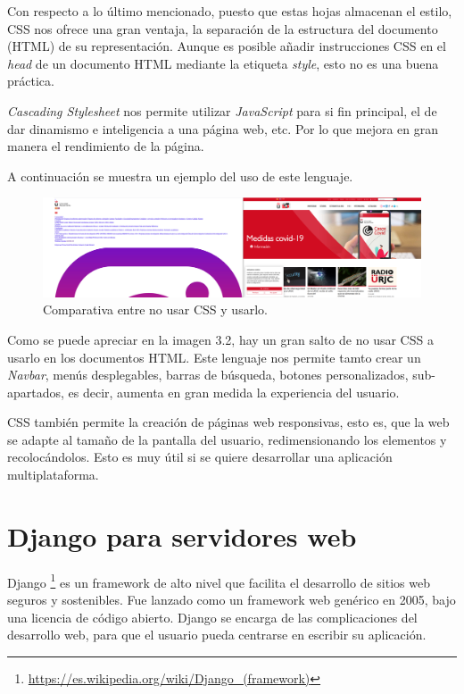 \documentclass[a4paper, 12pt]{book}
\begin{document}
Con respecto a lo último mencionado, puesto que estas hojas almacenan el estilo, CSS nos ofrece una gran ventaja, la separación de la estructura del documento (HTML) de su representación. Aunque es posible añadir instrucciones CSS en el \textit{head} de un documento HTML mediante la etiqueta \textit{style}, esto no es una buena práctica.

\textit{Cascading Stylesheet} nos permite utilizar \textit{JavaScript} para si fin principal, el de dar dinamismo e inteligencia a una página web, etc. Por lo que mejora en gran manera el rendimiento de la página.

A continuación se muestra un ejemplo del uso de este lenguaje.

\begin{figure}[H]
	\centering
    \includegraphics[width=15cm]{img/nocss_vs_css}
    \caption{Comparativa entre no usar CSS y usarlo.}
    \label{figura:nocss_vs_css}
\end{figure}

Como se puede apreciar en la imagen 3.2, hay un gran salto de no usar CSS a usarlo en los documentos HTML. Este lenguaje nos permite tamto crear un \textit{Navbar}, menús desplegables, barras de búsqueda, botones personalizados, sub-apartados, es decir, aumenta en gran medida la experiencia del usuario.

CSS también permite la creación de páginas web responsivas, esto es, que la web se adapte al tamaño de la pantalla del usuario, redimensionando los elementos y recolocándolos. Esto es muy útil si se quiere desarrollar una aplicación multiplataforma.

\section{Django para servidores web}
\label{sec:django}

Django \footnote{\url{https://es.wikipedia.org/wiki/Django_(framework)}} \cite{django} es un framework de alto nivel que facilita el desarrollo de sitios web seguros y sostenibles. Fue lanzado como un framework web genérico en 2005, bajo una licencia de código abierto. Django se encarga de las complicaciones del desarrollo web, para que el usuario pueda centrarse en escribir su aplicación.
\end{document}
